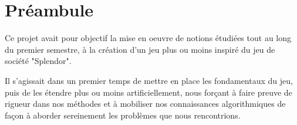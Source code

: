

\section*{Préambule}


    Ce projet avait pour objectif la mise en oeuvre de notions étudiées tout au long du premier 
semestre, à la création d'un jeu plus ou moins inspiré du jeu de société "Splendor". 

    Il s'agissait dans un premier temps de mettre en place les fondamentaux du jeu, puis de les 
étendre plus ou moins artificiellement, nous forçant à faire preuve de rigueur dans nos
méthodes et à mobiliser nos connaissances algorithmiques de façon à aborder sereinement les
problèmes que nous rencontrions.



